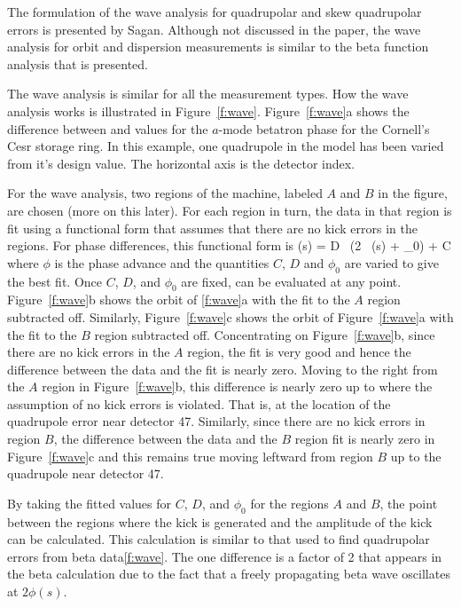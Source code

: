 The formulation of the wave analysis for quadrupolar and skew quadrupolar errors is presented by
Sagan\cite{b:wave}.  Although not discussed in the paper, the wave analysis for orbit and dispersion
measurements is similar to the beta function analysis that is presented.

The wave analysis is similar for all the measurement types. How the wave analysis works is
illustrated in Figure~\ref{f:wave}.  Figure~\ref{f:wave}a shows the difference between 
and  values for the $a$-mode betatron phase for the Cornell's Cesr storage ring. In this
example, one quadrupole in the model has been varied from it's design value. The horizontal axis is
the detector index.

For the wave analysis, two regions of the machine, labeled $A$ and $B$ in the figure, are chosen
(more on this later). For each region in turn, the data in that region is fit using a functional
form that assumes that there are no kick errors in the regions.  For phase differences, this
functional form is
\Begineq
  \delta \phi(s) = D \, \sin(2 \, \phi(s) + \phi_0) + C
  \label{xabps}
\Endeq
where $\phi$ is the phase advance and the quantities $C$, $D$ and $\phi_0$ are varied to give the
best fit.  Once $C$, $D$, and $\phi_0$ are fixed,  can be evaluated at any
point. Figure~\ref{f:wave}b shows the orbit of \ref{f:wave}a with the fit to the $A$ region
subtracted off. Similarly, Figure~\ref{f:wave}c shows the orbit of Figure~\ref{f:wave}a with the fit
to the $B$ region subtracted off. Concentrating on Figure~\ref{f:wave}b, since there are no kick
errors in the $A$ region, the fit is very good and hence the difference between the data and the fit
is nearly zero. Moving to the right from the $A$ region in Figure~\ref{f:wave}b, this difference is
nearly zero up to where the assumption of no kick errors is violated. That is, at the location of
the quadrupole error near detector 47. Similarly, since there are no kick errors in region $B$, the
difference between the data and the $B$ region fit is nearly zero in Figure~\ref{f:wave}c and this
remains true moving leftward from region $B$ up to the quadrupole near detector 47.

By taking the fitted values for $C$, $D$, and $\phi_0$ for the regions $A$ and $B$, the point
between the regions where the kick is generated and the amplitude of the kick can be
calculated. This calculation is similar to that used to find quadrupolar errors from beta
data\ref{f:wave}. The one difference is a factor of 2 that appears in the beta calculation due to
the fact that a freely propagating beta wave oscillates at $2\phi(s)$.

